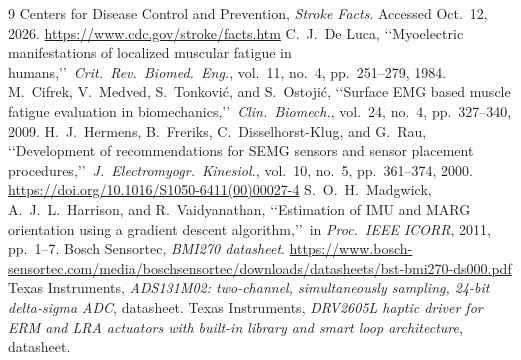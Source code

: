 \documentclass[11pt]{article}
\begin{document}
\begin{thebibliography}{9}\small
{} Centers for Disease Control and Prevention, \emph{Stroke Facts}.
  Accessed Oct.\ 12, 2026. \url{https://www.cdc.gov/stroke/facts.htm}
 C.\ J.\ De Luca, \lq\lq Myoelectric manifestations of localized
  muscular fatigue in humans,\rq\rq\ \emph{Crit.\ Rev.\ Biomed.\ Eng.}, vol.\ 11,
  no.\ 4, pp.\ 251--279, 1984.
 M.\ Cifrek, V.\ Medved, S.\ Tonkovi\'c, and S.\ Ostoji\'c,
  \lq\lq Surface EMG based muscle fatigue evaluation in biomechanics,\rq\rq\
  \emph{Clin.\ Biomech.}, vol.\ 24, no.\ 4, pp.\ 327--340, 2009.
\bibitem{hermens} H.\ J.\ Hermens, B.\ Freriks, C.\ Disselhorst-Klug, and
  G.\ Rau, \lq\lq Development of recommendations for SEMG sensors and sensor
  placement procedures,\rq\rq\ \emph{J.\ Electromyogr.\ Kinesiol.}, vol.\ 10,
  no.\ 5, pp.\ 361--374, 2000.
  \url{https://doi.org/10.1016/S1050-6411(00)00027-4}
 S.\ O.\ H.\ Madgwick, A.\ J.\ L.\ Harrison, and
  R.\ Vaidyanathan, \lq\lq Estimation of IMU and MARG orientation using a
  gradient descent algorithm,\rq\rq\ in \emph{Proc.\ IEEE ICORR}, 2011, pp.\ 1--7.
\bibitem{bmi270} Bosch Sensortec, \emph{BMI270 datasheet}.
  \url{https://www.bosch-sensortec.com/media/boschsensortec/downloads/datasheets/bst-bmi270-ds000.pdf}
\bibitem{ads} Texas Instruments, \emph{ADS131M02: two-channel, simultaneously
  sampling, 24-bit delta-sigma ADC}, datasheet.
 Texas Instruments, \emph{DRV2605L haptic driver for ERM and LRA
  actuators with built-in library and smart loop architecture}, datasheet.
\end{thebibliography}
\end{document}
